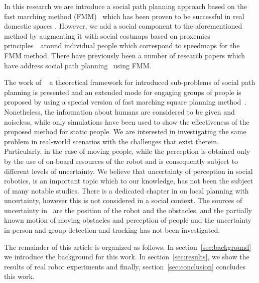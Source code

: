 In this research we are introduce a  social path planning approach based on the fast marching method (FMM)~\cite{sethian1999fast} which has been proven to be successful in real domestic spaces \cite{ventura2015}. However, we add a social component to the aforementioned method by augmenting it with social costmaps \textemdash based on proxemics principles~\cite{kirby2009companion}\textemdash~around individual people which correspond to speedmaps for the FMM method. There have previously been a number of research papers which have address social path planning~\cite{gomez2014fast,gomez2013social} using FMM. 

The work of ~\cite{gomez2014fast} a theoretical framework for introduced sub-problems of social path planning is presented and an extended mode for engaging groups of people is proposed by using a special version of fast marching square planning method~\cite{valero2013fast}. Nonetheless, the information about humans are considered to be given and noiseless, while only simulations have been used to show the effectiveness of the proposed method for static people. We are interested in investigating the same problem in real-world scenarios with the challenges that exist therein. Particularly, in the case of moving people, while the perception is obtained only by the use of on-board resources of the robot and is consequently subject to different levels of uncertainty. 
We believe that uncertainty of perception in social robotics, is an important topic which to our knowledge, has not been the subject of many notable studies. There is a dedicated chapter in \cite{correa2014uncertainty} on local planning with uncertainty, however this is not considered in a social context. The sources of uncertainty in~\cite{correa2014uncertainty} are the position of the robot and the obstacles, and the partially known motion of moving obstacles and perception of people and the uncertainty in person and group detection and tracking has not been investigated.


The remainder of this article is organized as follows. In section~\ref{sec:background} we introduce the background for this work. In section~\ref{sec:results}, we show the results of real robot experiments and finally, section~\ref{sec:conclusion} concludes this work.




